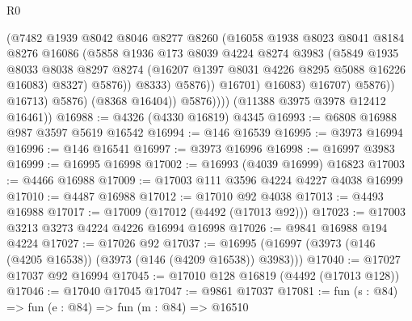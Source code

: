 \begin{lexlean}{R0}
\begin{coremodule}
                                  (@7482
                                    @1939
                                    @8042
                                    @8046
                                    @8277
                                    @8260
                                    (@16058
                                      @1938
                                      @8023
                                      @8041
                                      @8184
                                      @8276
                                      @16086
                                      (@5858
                                        @1936
                                        @173
                                        @8039
                                        @4224
                                        @8274
                                        @3983
                                        (@5849
                                          @1935
                                          @8033
                                          @8038
                                          @8297
                                          @8274
                                          (@16207 @1397 @8031 @4226 @8295 @5088 @16226 @16083)
                                          @8327)
                                        @5876))
                                    @8333)
                                  @5876))
                              @16701)
                            @16083)
                          @16707)
                        @5876))
                    @16713)
                  @5876)
                (@8368 @16404))
              @5876))))
      (@11388 @3975 @3978 @12412 @16461))
@16988 := @4326 (@4330 @16819) @4345
@16993 := @6808 @16988 @987 @3597 @5619 @16542
@16994 := @146 @16539
@16995 := @3973 @16994
@16996 := @146 @16541
@16997 := @3973 @16996
@16998 := @16997 @3983
@16999 := @16995 @16998
@17002 := @16993 (@4039 @16999) @16823
@17003 := @4466 @16988
@17009 := @17003 @111 @3596 @4224 @4227 @4038 @16999
@17010 := @4487 @16988
@17012 := @17010 @92 @4038
@17013 := @4493 @16988
@17017 := @17009 (@17012 (@4492 (@17013 @92)))
@17023 := @17003 @3213 @3273 @4224 @4226 @16994 @16998
@17026 := @9841 @16988 @194 @4224
@17027 := @17026 @92
@17037 := @16995 (@16997 (@3973 (@146 (@4205 @16538)) (@3973 (@146 (@4209 @16538)) @3983)))
@17040 := @17027 @17037 @92 @16994
@17045 := @17010 @128 @16819 (@4492 (@17013 @128))
@17046 := @17040 @17045
@17047 := @9861 @17037
@17081 := fun (s : @84) =>
  fun (e : @84) =>
  fun (m : @84) =>
  @16510

\end{coremodule}
\end{lexlean}
